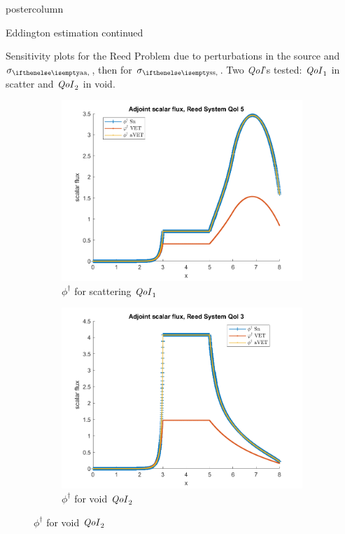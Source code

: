 \documentclass[xcolor={usenames,dvipsnames,svgnames,table}]{beamer}
\newcommand{\qoi}{{\it QoI}\xspace}
\begin{document}
\begin{frame}
\begin{columns}
\begin{column}{.33\textwidth}
\begin{beamercolorbox}[center,wd=\textwidth]{postercolumn}
\begin{minipage}[T]{0.95\textwidth}
{			    %
			    \begin{block}{Eddington estimation continued}		    
			    
Sensitivity plots for the Reed Problem due to perturbations in the source and $\siga$, then for $\sigs$. Two \qoi 's tested: $\qoi_1$ in scatter and $\qoi_2$ in void.
 
\begin{figure}[H]
\label{Case113Sens}
\centering
\begin{subfigure}{.4\textwidth}
  \centering
  \includegraphics[width=.98\linewidth]{posterfigures/774phia.png}  
  \caption{$\phi^\dag$ for scattering $\qoi_1$}
  \label{fig:sfig1}
\end{subfigure}%
\begin{subfigure}{.4\textwidth}
  \centering
  \includegraphics[width=.98\linewidth]{posterfigures/772phia.png}
  \caption{$\phi^\dag$ for void $\qoi_2$}
  \label{fig:sfig2}
\end{subfigure}


\end{figure}
\end{block}}
\end{minipage}
\end{beamercolorbox}
\end{column}
\end{columns}
\end{frame}
\end{document}
